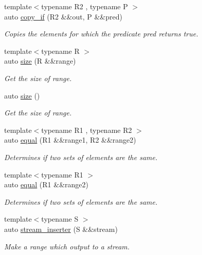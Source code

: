 \begin{DoxyCompactItemize}
{\footnotesize template$<$typename R2 , typename P $>$ }\\auto \mbox{\hyperlink{namespacerah_a1f17e9431b258cc701fa59672a65d7db}{copy\+\_\+if}} (R2 \&\&out, P \&\&pred)
\begin{DoxyCompactList}\small\item\em Copies the elements for which the predicate pred returns true. \end{DoxyCompactList}\item 
{\footnotesize template$<$typename R $>$ }\\auto \mbox{\hyperlink{namespacerah_a85af749badb4261aa3c97a1d98134493}{size}} (R \&\&range)
\begin{DoxyCompactList}\small\item\em Get the size of range. \end{DoxyCompactList}\item 
auto \mbox{\hyperlink{namespacerah_aaee48fa7a804b4fd19c6a78bdd8d4c85}{size}} ()
\begin{DoxyCompactList}\small\item\em Get the size of range. \end{DoxyCompactList}\item 
{\footnotesize template$<$typename R1 , typename R2 $>$ }\\auto \mbox{\hyperlink{namespacerah_abf321dffb33d6a2d752aa091fdba7bbf}{equal}} (R1 \&\&range1, R2 \&\&range2)
\begin{DoxyCompactList}\small\item\em Determines if two sets of elements are the same. \end{DoxyCompactList}\item 
{\footnotesize template$<$typename R1 $>$ }\\auto \mbox{\hyperlink{namespacerah_a3434aacc26937d3ff50b5db4286feda6}{equal}} (R1 \&\&range2)
\begin{DoxyCompactList}\small\item\em Determines if two sets of elements are the same. \end{DoxyCompactList}\item 
{\footnotesize template$<$typename S $>$ }\\auto \mbox{\hyperlink{namespacerah_a3f7b590b1bd8a44b5b2d6f4e35f1837c}{stream\+\_\+inserter}} (S \&\&stream)
\begin{DoxyCompactList}\small\item\em Make a range which output to a stream. \end{DoxyCompactList}\item 

\end{DoxyCompactItemize}
